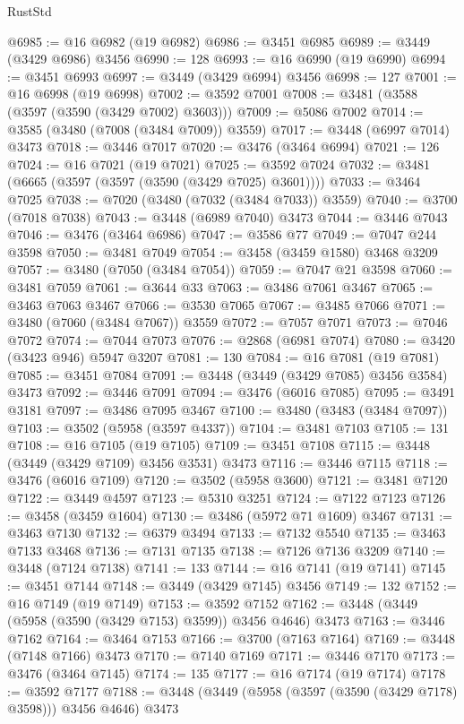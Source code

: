 \begin{lexlean}{RustStd}
\begin{coremodule}
{{{{{{{{{{{{{{{{{{{@6985 := @16 @6982 (@19 @6982)
@6986 := @3451 @6985
@6989 := @3449 (@3429 @6986) @3456
@6990 := 128
@6993 := @16 @6990 (@19 @6990)
@6994 := @3451 @6993
@6997 := @3449 (@3429 @6994) @3456
@6998 := 127
@7001 := @16 @6998 (@19 @6998)
@7002 := @3592 @7001
@7008 := @3481 (@3588 (@3597 (@3590 (@3429 @7002) @3603)))
@7009 := @5086 @7002
@7014 := @3585 (@3480 (@7008 (@3484 @7009)) @3559)
@7017 := @3448 (@6997 @7014) @3473
@7018 := @3446 @7017
@7020 := @3476 (@3464 @6994)
@7021 := 126
@7024 := @16 @7021 (@19 @7021)
@7025 := @3592 @7024
@7032 := @3481 (@6665 (@3597 (@3597 (@3590 (@3429 @7025) @3601))))
@7033 := @3464 @7025
@7038 := @7020 (@3480 (@7032 (@3484 @7033)) @3559)
@7040 := @3700 (@7018 @7038)
@7043 := @3448 (@6989 @7040) @3473
@7044 := @3446 @7043
@7046 := @3476 (@3464 @6986)
@7047 := @3586 @77
@7049 := @7047 @244 @3598
@7050 := @3481 @7049
@7054 := @3458 (@3459 @1580) @3468 @3209
@7057 := @3480 (@7050 (@3484 @7054))
@7059 := @7047 @21 @3598
@7060 := @3481 @7059
@7061 := @3644 @33
@7063 := @3486 @7061 @3467
@7065 := @3463 @7063 @3467
@7066 := @3530 @7065
@7067 := @3485 @7066
@7071 := @3480 (@7060 (@3484 @7067)) @3559
@7072 := @7057 @7071
@7073 := @7046 @7072
@7074 := @7044 @7073
@7076 := @2868 (@6981 @7074)
@7080 := @3420 (@3423 @946) @5947 @3207
@7081 := 130
@7084 := @16 @7081 (@19 @7081)
@7085 := @3451 @7084
@7091 := @3448 (@3449 (@3429 @7085) @3456 @3584) @3473
@7092 := @3446 @7091
@7094 := @3476 (@6016 @7085)
@7095 := @3491 @3181
@7097 := @3486 @7095 @3467
@7100 := @3480 (@3483 (@3484 @7097))
@7103 := @3502 (@5958 (@3597 @4337))
@7104 := @3481 @7103
@7105 := 131
@7108 := @16 @7105 (@19 @7105)
@7109 := @3451 @7108
@7115 := @3448 (@3449 (@3429 @7109) @3456 @3531) @3473
@7116 := @3446 @7115
@7118 := @3476 (@6016 @7109)
@7120 := @3502 (@5958 @3600)
@7121 := @3481 @7120
@7122 := @3449 @4597
@7123 := @5310 @3251
@7124 := @7122 @7123
@7126 := @3458 (@3459 @1604)
@7130 := @3486 (@5972 @71 @1609) @3467
@7131 := @3463 @7130
@7132 := @6379 @3494
@7133 := @7132 @5540
@7135 := @3463 @7133 @3468
@7136 := @7131 @7135
@7138 := @7126 @7136 @3209
@7140 := @3448 (@7124 @7138)
@7141 := 133
@7144 := @16 @7141 (@19 @7141)
@7145 := @3451 @7144
@7148 := @3449 (@3429 @7145) @3456
@7149 := 132
@7152 := @16 @7149 (@19 @7149)
@7153 := @3592 @7152
@7162 := @3448 (@3449 (@5958 (@3590 (@3429 @7153) @3599)) @3456 @4646) @3473
@7163 := @3446 @7162
@7164 := @3464 @7153
@7166 := @3700 (@7163 @7164)
@7169 := @3448 (@7148 @7166) @3473
@7170 := @7140 @7169
@7171 := @3446 @7170
@7173 := @3476 (@3464 @7145)
@7174 := 135
@7177 := @16 @7174 (@19 @7174)
@7178 := @3592 @7177
@7188 := @3448 (@3449 (@5958 (@3597 (@3590 (@3429 @7178) @3598))) @3456 @4646) @3473
}}}}}}}}}}}}}}}}}}}
\end{coremodule}
\end{lexlean}
